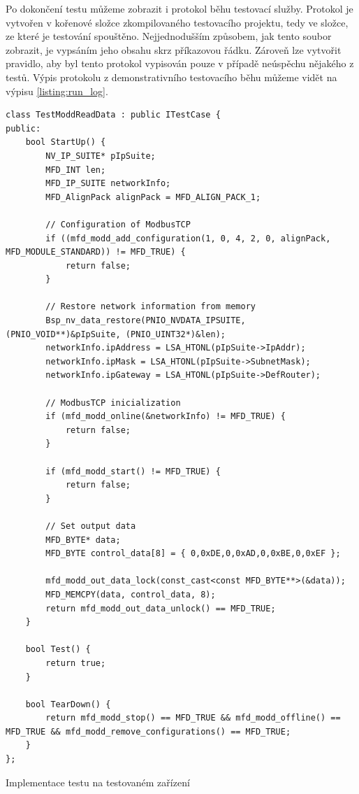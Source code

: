 Po dokončení testu můžeme zobrazit i protokol běhu testovací služby. Protokol je vytvořen v kořenové složce zkompilovaného testovacího projektu, tedy ve složce, ze které je testování spouštěno. Nejjednodušším způsobem, jak tento soubor zobrazit, je vypsáním jeho obsahu skrz příkazovou řádku. Zároveň lze vytvořit pravidlo, aby byl tento protokol vypisován pouze v případě neúspěchu nějakého z testů. Výpis protokolu z demonstrativního testovacího běhu můžeme vidět na výpisu \ref{listing:run_log}.

\begin{listing}[p]
    \centering
    \begin{verbatim}
class TestModdReadData : public ITestCase {
public:
    bool StartUp() {
        NV_IP_SUITE* pIpSuite;
        MFD_INT len;
        MFD_IP_SUITE networkInfo;
        MFD_AlignPack alignPack = MFD_ALIGN_PACK_1;

        // Configuration of ModbusTCP
        if ((mfd_modd_add_configuration(1, 0, 4, 2, 0, alignPack, MFD_MODULE_STANDARD)) != MFD_TRUE) { 
            return false; 
        }

        // Restore network information from memory
        Bsp_nv_data_restore(PNIO_NVDATA_IPSUITE, (PNIO_VOID**)&pIpSuite, (PNIO_UINT32*)&len);
        networkInfo.ipAddress = LSA_HTONL(pIpSuite->IpAddr);
        networkInfo.ipMask = LSA_HTONL(pIpSuite->SubnetMask);
        networkInfo.ipGateway = LSA_HTONL(pIpSuite->DefRouter);

        // ModbusTCP inicialization
        if (mfd_modd_online(&networkInfo) != MFD_TRUE) {
            return false;
        }

        if (mfd_modd_start() != MFD_TRUE) {
            return false;
        }
            
        // Set output data
        MFD_BYTE* data;
        MFD_BYTE control_data[8] = { 0,0xDE,0,0xAD,0,0xBE,0,0xEF };
            
        mfd_modd_out_data_lock(const_cast<const MFD_BYTE**>(&data));
        MFD_MEMCPY(data, control_data, 8);
        return mfd_modd_out_data_unlock() == MFD_TRUE;
    }

    bool Test() {
        return true;
    }

    bool TearDown() {
        return mfd_modd_stop() == MFD_TRUE && mfd_modd_offline() == MFD_TRUE && mfd_modd_remove_configurations() == MFD_TRUE;
    }
};
    \end{verbatim}
\caption{Implementace testu na testovaném zařízení}
\label{listing:testcase_device}
\end{listing}


